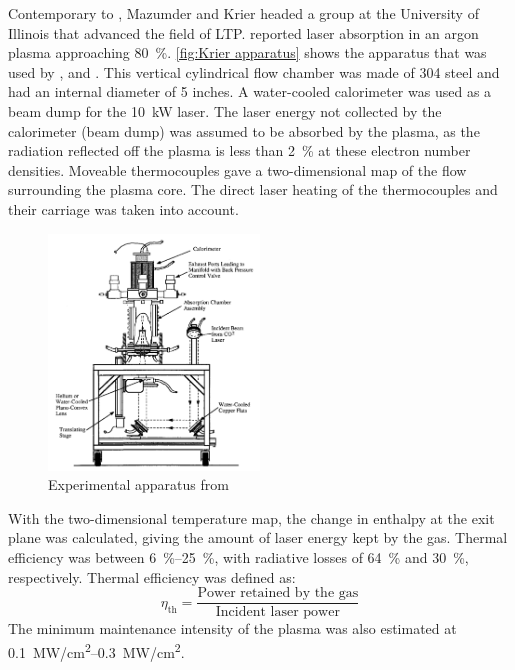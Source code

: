         Contemporary to \textcite{keeferPowerAbsorptionLasersustained1986a}, Mazumder and Krier headed a group at the University of Illinois that advanced the field of LTP. \textcite{krierContinuousWaveLaser1986a} reported laser absorption in an argon plasma approaching \qty{80}{\%}. \autoref{fig:Krier apparatus} shows the apparatus that was used by \textcite{krierContinuousWaveLaser1986a}, \textcite{zerkleLasersustainedArgonPlasmas1990} and \textcite{chenEmissionSpectroscopyCw1989a}. This vertical cylindrical flow chamber was made of 304 steel and had an internal diameter of 5 inches. A water-cooled calorimeter was used as a beam dump for the \qty{10}{kW}  laser. The laser energy not collected by the calorimeter (beam dump) was assumed to be absorbed by the plasma, as the radiation reflected off the plasma is less than \qty{2}{\%} at these electron number densities. Moveable thermocouples gave a two-dimensional map of the flow surrounding the plasma core. The direct laser heating of the thermocouples and their carriage was taken into account.
        \begin{figure}[!ht]
            \centering
            \includegraphics[width=0.5\textwidth]{assets/2 background/Illinois (Krier) Apparatus.png}
            \caption{Experimental apparatus from \textcite{zerkleLasersustainedArgonPlasmas1990}}
            \label{fig:Krier apparatus}
        \end{figure}
        With the two-dimensional temperature map, the change in enthalpy at the exit plane was calculated, giving the amount of laser energy kept by the gas. Thermal efficiency was between \qtyrange{6}{25}{\%}, with radiative losses of \qty{64}{\%} and \qty{30}{\%}, respectively. Thermal efficiency was defined as:
        \[\eta_\mathrm{th} =  \frac{\text{Power retained by the gas}}{\text{Incident laser power}}\]
        The minimum maintenance intensity of the plasma was also estimated at \qtyrange{0.1}{0.3}{MW/cm^2}.

